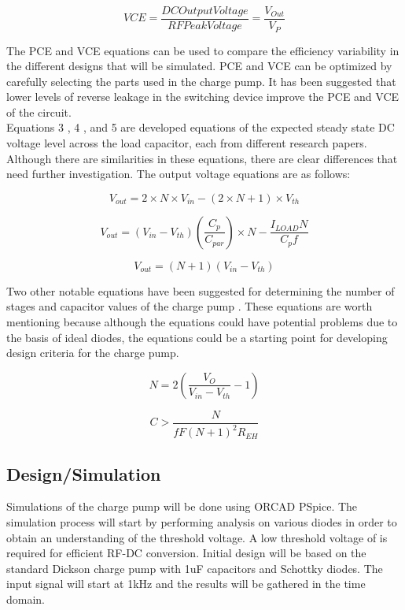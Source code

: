 \documentclass[12pt]{article}
\begin{document}
\begin{equation}
VCE = \frac{DC Output Voltage}{RF Peak Voltage} = \frac{V_{Out}}{V_{P}}\label{eq:VCE}
\end{equation}

	\noindent The PCE and VCE equations can be used to compare the efficiency variability in the different designs that will be simulated. PCE and VCE can be optimized by carefully selecting the parts used in the charge pump. It has been suggested that lower levels of reverse leakage in the switching device improve the PCE and VCE of the circuit.\\
	
	\noindent Equations 3 \cite{Vyas}, 4 \cite{Guler}, and 5 \cite{Vinco} are developed equations of the expected steady state DC voltage level across the load capacitor, each from different research papers. Although there are similarities in these equations, there are clear differences that need further investigation. The output voltage equations are as follows:
	
\begin{equation}
V_{out} = 2\times N\times V_{in} - (2\times N + 1)\times V_{th}
\end{equation}

\begin{equation}
V_{out} = (V_{in} - V_{th})(\frac{C_p}{C_{par}})\times N - \frac{I_{LOAD}N}{C_pf}
\end{equation}

\begin{equation}
V_{out} = (N + 1)(V_{in} - V_{th})
\end{equation}

	\noindent Two other notable equations have been suggested for determining the number of stages and capacitor values of the charge pump \cite{Vinco}. These equations are worth mentioning because although the equations could have potential problems due to the basis of ideal diodes, the equations could be a starting point for developing design criteria for the charge pump.

\begin{equation}
N = 2(\frac{V_O}{V_{in}-V_{th}}-1)
\end{equation}

\begin{equation}
C > \frac{N}{fF(N+1)^2R_{EH}}
\end{equation}

	\subsection{Design/Simulation}
	Simulations of the charge pump will be done using ORCAD PSpice. The simulation process will start by performing analysis on various diodes in order to obtain an understanding of the threshold voltage. A low threshold voltage of  is required for efficient RF-DC conversion. Initial design will be based on the standard Dickson charge pump with 1uF capacitors and Schottky diodes. The input signal will start at 1kHz and the results will be gathered in the time domain.\\
	
\end{document}
